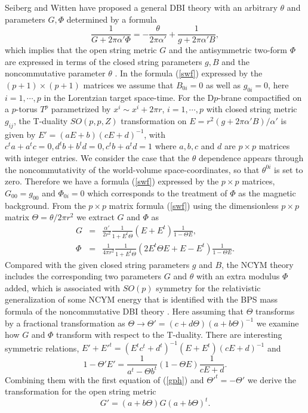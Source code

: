 \documentclass[12pt,a4paper]{article}
\newcommand{\al}{\alpha'}
\newcommand{\te}{\theta}
\newcommand{\Te}{\Theta}
\begin{document}
Seiberg and Witten have proposed a general DBI theory with an arbitrary
$\te$ and parameters $G, \Phi$ determined by a formula
\begin{equation}
\frac{1}{G + 2\pi\al \Phi} = - \frac{\te}{2\pi\al} + 
\frac{1}{g + 2\pi\al B},
\label{swf}\end{equation}
which implies that the open string metric $G$ and the antisymmetric 
two-form $\Phi$ are expressed in terms of the closed string parameters
$g, B$ and the noncommutative parameter $\te$ \cite{SW}. 
In the formula (\ref{swf}) expressed by the $(p+1)\times (p+1)$ matrices
we assume that $B_{0i}=0$ as well as $g_{0i}=0$, here $i=1,\cdots,p$ 
in the Lorentzian target space-time. 
For the D$p$-brane compactified on a $p$-torus $T^p$
parametrized by $x^i \sim x^i + 2\pi r$,
$i = 1,\cdots,p$ with closed string metric $g_{ij}$, the T-duality
$SO(p,p,Z)$ transformation on $E = r^2(g + 2\pi\al B)/\al$ is given by 
$E' = (aE + b)(cE + d)^{-1}$, with $c^ta + a^tc = 0, d^tb + b^td = 0,
c^tb + a^td = 1$ where $a, b, c$ and $d$ are $p\times p$ matrices with
integer entries. We consider the case that the $\te$ dependence appears
through the noncommutativity of the world-volume space-coordinates, 
so that  $\te^{0i}$ is set to zero.
 Therefore we have a formula (\ref{swf}) expressed by the
$p\times p$ matrices, $G_{00}=g_{00}$ and 
$\Phi_{0i}=0$ which corresponds to the treatment 
of $\Phi$ as the magnetic background. From the $p\times p$ 
matrix formula (\ref{swf})  using the dimensionless $p\times p$ 
matrix $\Te = \te/2\pi r^2$ we extract $G$ and $\Phi$ as
\begin{eqnarray}
G &=& \frac{\al}{2r^2} \frac{1}{1+E^t\Te}( E + E^t )\frac{1}{1-\Te E}, 
\nonumber \\ 
\Phi &=& \frac{1}{4\pi r^2} \frac{1}{1+E^t\Te}( 2E^t\Te E + E - E^t )
\frac{1}{1-\Te E}.
\label{gph}\end{eqnarray}
Compared with the given closed string parameters $g$ and $B$, the NCYM
theory includes the corresponding two parameters $G$ and $\te$ with an 
extra modulus $\Phi$ added, which is associated with $SO(p)$ symmetry for
the relativistic generalization of some NCYM energy that is identified 
with the BPS mass formula of the noncommutative DBI theory \cite{PS}.
Here assuming that $\Te$ transforms by a fractional transformation as
$\Te \rightarrow \Te' = (c + d\Te)(a + b\Te)^{-1}$ we  examine
how $G$ and $\Phi$ transform with respect to the T-duality. There are 
interesting symmetric relations, $E' + E'^t = (E^tc^t + d^t)^{-1}
(E + E^t)(cE+ d)^{-1}$ and 
\begin{equation}
1- \Te 'E' = \frac{1}{a^t - \Te b^t}(1-\Te E)\frac{1}{cE + d}.
\label{the}\end{equation}
Combining them with the first equation of (\ref{gph}) and ${\Te'}^t =
-\Te'$ we derive the transformation for the open string metric
\begin{equation}
G' = ( a + b\Te ) G ( a + b \Te )^t.
\label{tg}\end{equation}
\end{document}
